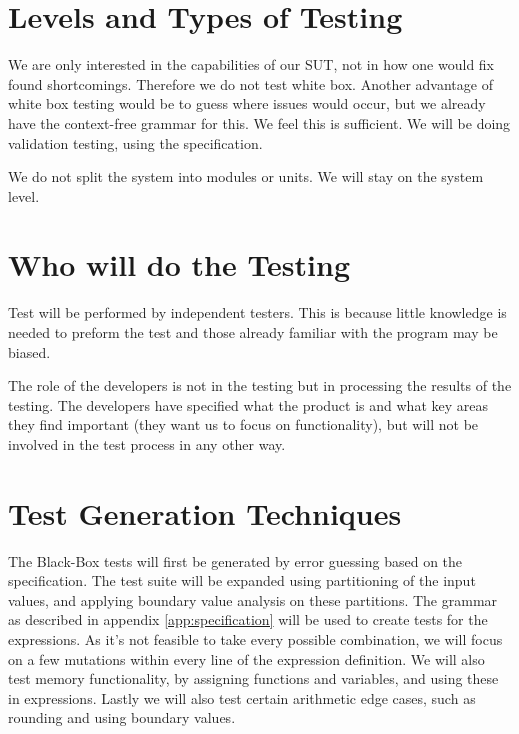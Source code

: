 \documentclass[11pt,a4paper]{article}
\begin{document}
\section{Levels and Types of Testing} \label{levels}

We are only interested in the capabilities of our SUT, not in how one
would fix found shortcomings. Therefore we do not test white box. Another advantage of white box testing would be to guess where issues would occur, but we already have the context-free grammar for this. We feel this is sufficient. %
We will be doing validation testing, using the specification.

We do not split the system into modules or units. We will stay on the system level.


\section{Who will do the Testing}

Test will be performed by independent testers. This is because little
knowledge is needed to preform the test and those already familiar
with the program may be biased. \label{sec:test-generation}

The role of the developers is not in the testing but in processing the
results of the testing. The developers have specified what the product is and what key areas they find important (they want us to focus on functionality), but will not be involved in the test process in any other way.






\section{Test Generation Techniques}
The Black-Box tests will first be generated by error guessing based on the specification. The test suite will be expanded using partitioning of the input values, and applying boundary value analysis on these partitions.
The grammar as described in appendix \ref{app:specification} will be used to create tests for the expressions. As it's not feasible to take every possible combination, we will focus on a few mutations within every line of the expression definition.
We will also test memory functionality, by assigning functions and variables, and using these in expressions. Lastly we will also test certain arithmetic edge cases, such as rounding and using boundary values.
\end{document}
